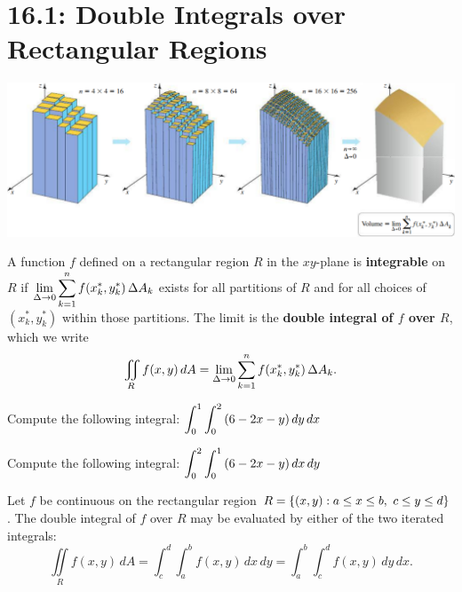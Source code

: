 \documentclass[../mathNotesPreamble]{subfiles}
\begin{document}
\section{16.1: Double Integrals over Rectangular Regions}

  \begin{center}
    \includegraphics[width=0.975\linewidth]{../images/briggs_16_01/fig16_04}
  \end{center}

  \begin{defn*}
    A function $f$ defined on a rectangular region $R$ in the $xy$-plane is \textbf{integrable} on $R$ if $\displaystyle\lim_{\Delta\to 0} \sum_{k=1}^n f(x_k^*, y_k^*)\, \Delta A_k$ exists for all partitions of $R$ and for all choices of $(x_k^*, y_k^*)$ within those partitions. The limit is the \textbf{double integral of $f$ over $R$}, which we write
      \[\iint\limits_R f(x,y)\,dA=\lim_{\Delta\to 0} \sum_{k=1}^n f(x_k^*, y_k^*)\,\Delta A_k.\]
  \end{defn*}

  \begin{ex*}
    Compute the following integral: $\displaystyle \int_0^1 \int_0^2 {\left(6-2x-y\right)}\,dy\,dx$
  \end{ex*}
  \pagebreak

  \begin{ex*}
    Compute the following integral: $\displaystyle \int_0^2 \int_0^1 {\left(6-2x-y\right)}\,dx\,dy$
  \end{ex*}
  \begin{thmBox*}
    Let $f$ be continuous on the rectangular region $R={\left\{(x,y):a\leq x\leq b,\ c\leq y\leq d\right\}}$. The double integral of $f$ over $R$ may be evaluated by either of the two iterated integrals:
      \[\iint\limits_R f(x,y)\,dA=\int_c^d\int_a^b f(x,y)\,dx\,dy=\int_a^b\int_c^d f(x,y)\,dy\,dx.\]
  \end{thmBox*}
  \pagebreak
\end{document}
